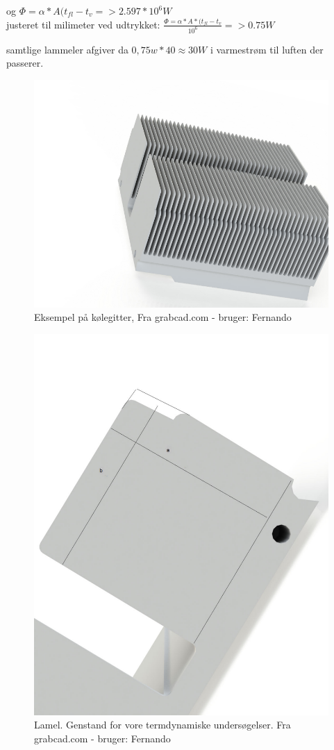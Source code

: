 
og $ \Phi = \alpha*A(t_{fl}-t_v =>2.597*10^6 W $\\ 
justeret til milimeter ved udtrykket: $\frac{\Phi = \alpha*A*(t_{fl}-t_v}{10^6} =>0.75 W$

samtlige lammeler afgiver da $0,75 w* 40 \approx 30 W$ i varmestrøm til luften der passerer. 

\begin{figure}
	\centering
	\includegraphics[width=0.7\linewidth]{billeder/heatsink1}
	\caption{Eksempel på kølegitter, Fra grabcad.com - bruger: Fernando}
	\label{fig:heatsink1}
\end{figure}


\begin{figure}
	\centering
	\includegraphics[width=0.7\linewidth]{billeder/lamel}
	\caption{Lamel. Genstand for vore termdynamiske undersøgelser. Fra grabcad.com - bruger: Fernando}
	\label{fig:lamel}
\end{figure}
